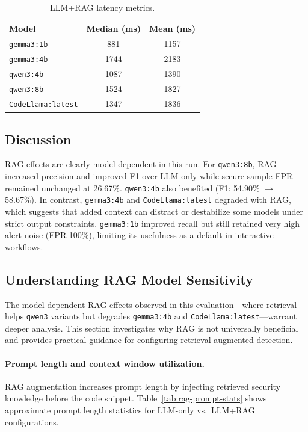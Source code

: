 \begin{table}[H]
  \centering
  \caption{LLM+RAG latency metrics.}
  \label{tab:eval-rag-latency}
  \small
  \begin{tabular}{lcc}
    \toprule
    Model & Median (ms) & Mean (ms) \\
    \midrule
    \texttt{gemma3:1b} & 881 & 1157 \\
    \texttt{gemma3:4b} & 1744 & 2183 \\
    \texttt{qwen3:4b} & 1087 & 1390 \\
    \texttt{qwen3:8b} & 1524 & 1827 \\
    \texttt{CodeLlama:latest} & 1347 & 1836 \\
    \bottomrule
  \end{tabular}
\end{table}

\subsection*{Discussion}

RAG effects are clearly model-dependent in this run. For \texttt{qwen3:8b}, RAG increased precision and improved F1 over LLM-only while secure-sample FPR remained unchanged at 26.67\%. \texttt{qwen3:4b} also benefited (F1: 54.90\% $\rightarrow$ 58.67\%). In contrast, \texttt{gemma3:4b} and \texttt{CodeLlama:latest} degraded with RAG, which suggests that added context can distract or destabilize some models under strict output constraints. \texttt{gemma3:1b} improved recall but still retained very high alert noise (FPR 100\%), limiting its usefulness as a default in interactive workflows.

\subsection{Understanding RAG Model Sensitivity}
\label{sec:eval-rag-sensitivity}

The model-dependent RAG effects observed in this evaluation—where retrieval helps \texttt{qwen3} variants but degrades \texttt{gemma3:4b} and \texttt{CodeLlama:latest}—warrant deeper analysis. This section investigates why RAG is not universally beneficial and provides practical guidance for configuring retrieval-augmented detection.

\paragraph{Prompt length and context window utilization.}
RAG augmentation increases prompt length by injecting retrieved security knowledge before the code snippet. Table~\ref{tab:rag-prompt-stats} shows approximate prompt length statistics for LLM-only vs.\ LLM+RAG configurations.

